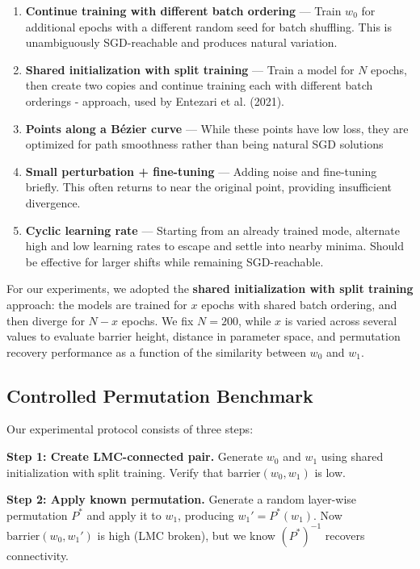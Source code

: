 \documentclass[11pt,a4paper]{article}
\begin{document}
\begin{enumerate}
    \item \textbf{Continue training with different batch ordering} — Train $w_0$ for additional epochs with a different random seed for batch shuffling. This is unambiguously SGD-reachable and produces natural variation.
    
    \item \textbf{Shared initialization with split training} — Train a model for $N$ epochs, then create two copies and continue training each with different batch orderings - approach, used by Entezari et al. (2021).
    
    \item \textbf{Points along a Bézier curve} — While these points have low loss, they are optimized for path smoothness rather than being natural SGD solutions
    
    \item \textbf{Small perturbation + fine-tuning} — Adding noise and fine-tuning briefly. This often returns to near the original point, providing insufficient divergence.
    
    \item \textbf{Cyclic learning rate} — Starting from an already trained mode, alternate high and low learning rates to escape and settle into nearby minima. Should be effective for larger shifts while remaining SGD-reachable.
\end{enumerate}

For our experiments, we adopted the \textbf{shared initialization with split training} approach: the models are trained for $x$ epochs with shared batch ordering, and then diverge for $N - x$ epochs. We fix $N = 200$, while $x$ is varied across several values to evaluate barrier height, distance in parameter space, and permutation recovery performance as a function of the similarity between $w_0$ and $w_1$.

\subsection{Controlled Permutation Benchmark}

Our experimental protocol consists of three steps:

\textbf{Step 1: Create LMC-connected pair.} Generate $w_0$ and $w_1$ using shared initialization with split training. Verify that $\text{barrier}(w_0, w_1)$ is low.

\textbf{Step 2: Apply known permutation.} Generate a random layer-wise permutation $P^*$ and apply it to $w_1$, producing $w_1' = P^*(w_1)$. Now $\text{barrier}(w_0, w_1')$ is high (LMC broken), but we know $(P^*)^{-1}$ recovers connectivity.
\end{document}
